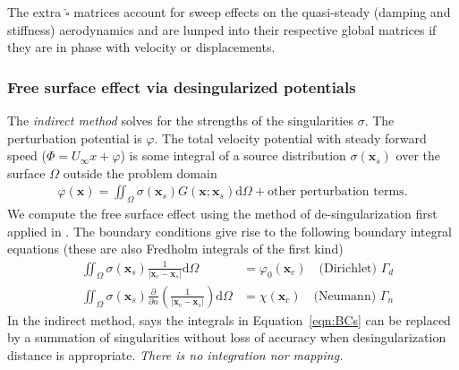 \documentclass[10pt]{article}
\newcommand{\pp}[2]{\frac{\partial #1}{\partial #2}}
\newcommand{\mbf}[1]{\mathbf{#1}}
\newcommand{\be}{\begin{eqnarray}}
\newcommand{\ee}{\end{eqnarray}}
\newcommand{\beq}{\begin{equation}\begin{aligned}}
\newcommand{\eeq}{\end{aligned}\end{equation}}
\newcommand{\Uinf}{U_{\infty}}
\newcommand{\tn}[1]{\textrm{#1}}
\begin{document}
% 
The extra $\hat{\square}$ matrices account for sweep effects on the quasi-steady (damping and stiffness) aerodynamics and are lumped into their respective global matrices if they are in phase with velocity or displacements.

\subsubsection{Free surface effect via desingularized potentials}

The \emph{indirect method} solves for the strengths of the singularities $\sigma$.
The perturbation potential is $\varphi$.
The total velocity potential with steady forward speed ($\Phi = \Uinf x + \varphi $) is some integral of a source distribution $\sigma(\mbf{x}_s)$ over the surface $\Omega$ outside the problem domain
\be
\label{eqn:Indirect}
\boxed{
    \varphi(\mbf{x}) = \iint_\Omega \sigma(\mbf{x}_s) G(\mbf{x};\mbf{x}_s) \tn{d}\Omega
    + \tn{other perturbation terms}
}
.
\ee
We compute the free surface effect using the method of de-singularization first applied in \citet{Cao1991}.
The boundary conditions give rise to the following boundary integral equations (these are also Fredholm integrals of the first kind)
\beq
\label{eqn:BCs}
&
\iint_{\Omega}\sigma(\mbf{x}_s)\frac{1}{\left| \mbf{x}_c - \mbf{x}_s \right| } \tn{d} \Omega & = \varphi_0(\mbf{x}_c) \quad \tn{(Dirichlet) } \Gamma_d
\\
& \iint_{\Omega} \sigma(\mbf{x}_s) \pp{}{n}\left(\frac{1}{\left| \mbf{x}_c - \mbf{x}_s\right|}\right)\tn{d} \Omega & = \chi(\mbf{x}_c) \quad \tn{(Neumann) } \Gamma_n
\eeq
In the indirect method, \citet{Cao1991} says the integrals in Equation~\eqref{eqn:BCs} can be replaced by a summation of singularities without loss of accuracy when desingularization distance is appropriate.
\emph{There is no integration nor mapping.}
\end{document}
